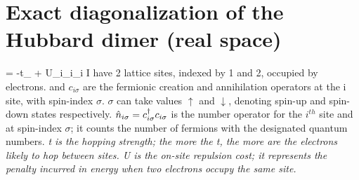 \documentclass[12pt]{article}
\begin{document}
\newpage
\section{Exact diagonalization of the Hubbard dimer (real space)}

\beq
\ham = -t\sum_\sigma{} + U\sum_i_{i\uparrow}_{i\downarrow}
\eeq
I have 2 lattice sites, indexed by 1 and 2, occupied by electrons.  and \(c_{i\sigma}\) are the fermionic creation and annihilation operators at the i site, with spin-index \(\sigma\). \(\sigma\) can take values \(\uparrow\) and \(\downarrow\), denoting spin-up and spin-down states respectively. \(\hat{n}_{i\sigma}=c_{{i}{\sigma}}^\dagger c_{{i}{\sigma}}\) is the number operator for the \(i^{th}\) site and at spin-index \(\sigma\); it counts the number of fermions with the designated quantum numbers.  \it t is the hopping strength; the more the t, the more are the electrons likely to hop between sites. \it U is the on-site repulsion cost; it represents the penalty incurred in energy when two electrons occupy the same site.
\end{document}
